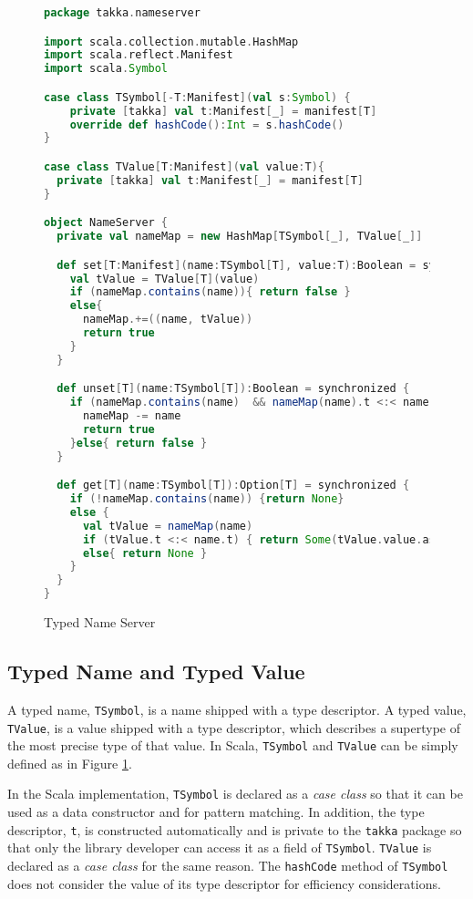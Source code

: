 \begin{figure}[p]
\begin{lstlisting}[language=scala]
package takka.nameserver

import scala.collection.mutable.HashMap
import scala.reflect.Manifest
import scala.Symbol

case class TSymbol[-T:Manifest](val s:Symbol) {
    private [takka] val t:Manifest[_] = manifest[T]
    override def hashCode():Int = s.hashCode()  
}

case class TValue[T:Manifest](val value:T){
  private [takka] val t:Manifest[_] = manifest[T]
}

object NameServer {
  private val nameMap = new HashMap[TSymbol[_], TValue[_]]

  def set[T:Manifest](name:TSymbol[T], value:T):Boolean = synchronized {
    val tValue = TValue[T](value)
    if (nameMap.contains(name)){ return false }
    else{
      nameMap.+=((name, tValue))
      return true
    }
  }

  def unset[T](name:TSymbol[T]):Boolean = synchronized {
    if (nameMap.contains(name)  && nameMap(name).t <:< name.t  ){
      nameMap -= name
      return true
    }else{ return false }
  }  

  def get[T](name:TSymbol[T]):Option[T] = synchronized {
    if (!nameMap.contains(name)) {return None}
    else { 
      val tValue = nameMap(name)
      if (tValue.t <:< name.t) { return Some(tValue.value.asInstanceOf[T]) }
      else{ return None }
    }
  }
}
\end{lstlisting}
  \caption{Typed Name Server}
  \label{fig:takka_nameserver} 
\end{figure}




\subsection{Typed Name and Typed Value}

A typed name, {\tt TSymbol}, is a name shipped with a type descriptor.  A 
typed value, {\tt TValue}, is a value shipped with a type descriptor, which
describes a supertype of the most precise type of that value.  
In Scala, {\tt TSymbol} and {\tt TValue} can be simply defined as in Figure
\ref{fig:takka_nameserver}.

In the Scala implementation, {\tt TSymbol} is declared as a {\it case class} so that it can be 
used as a data constructor and for pattern matching.  In addition, the
type descriptor, {\tt t}, is constructed automatically and is private to the
{\tt takka} package so that only the library developer can access it as a field 
 of {\tt TSymbol}. {\tt TValue} is declared as a {\it case class} for the same 
reason.  The {\tt hashCode} method of {\tt TSymbol} does not consider the
value of its type descriptor for efficiency considerations.

